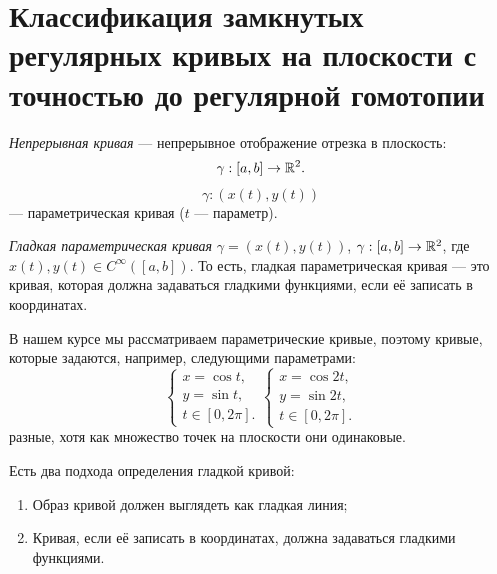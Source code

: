 \section{Классификация замкнутых регулярных кривых на плоскости с точностью до регулярной гомотопии}

\begin{definition}
    \textit{Непрерывная кривая} — непрерывное отображение отрезка в плоскость: $$\gamma: [a,b] \to \mathbb{R}^2.$$
    $$\gamma: (x(t), y(t))$$ — параметрическая кривая ($t$ — параметр).
\end{definition} 

\begin{definition}
    \textit{Гладкая параметрическая кривая} $\gamma = (x(t), y(t))$, $\gamma: [a,b] \to \mathbb{R}^2$, где $x(t), y(t) \in C^{\infty}([a,b])$. То есть, гладкая параметрическая кривая — это кривая, которая должна задаваться гладкими функциями, если её записать в координатах.
\end{definition}

В нашем курсе мы рассматриваем параметрические кривые, поэтому кривые, которые задаются, например, следующими параметрами:
$$\begin{cases}
    x = \cos{t}, \\
    y = \sin{t}, \\
    t \in [0, 2 \pi].
\end{cases}
\begin{cases}
    x = \cos{2t}, \\
    y = \sin{2t}, \\
    t \in [0, 2 \pi].
\end{cases}$$
разные, хотя как множество точек на плоскости они одинаковые.

Есть два подхода определения гладкой кривой:
\begin{enumerate}
    \item Образ кривой должен выглядеть как гладкая линия;
    \item Кривая, если её записать в координатах, должна задаваться гладкими функциями.
\end{enumerate}

